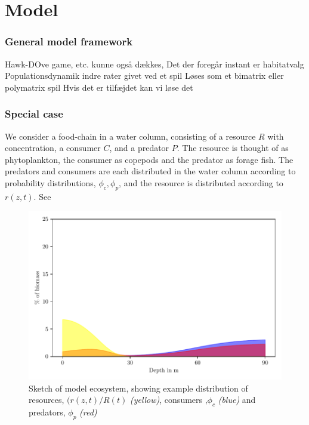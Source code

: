 
\section{Model}
\subsubsection*{General model framework}
Hawk-DOve game, etc. kunne også dækkes,
Det der foregår instant er habitatvalg
Populationsdynamik indre rater givet ved et spil
Løses som et bimatrix eller polymatrix spil
Hvis det er tilfæjdet kan vi løse det


\subsubsection*{Special case}
We consider a food-chain in a water column, consisting of a resource $R$ with concentration, a consumer $C$, and a predator $P$. The resource is thought of as phytoplankton, the consumer as copepods and the predator as forage fish. The predators and consumers are each distributed in the water column according to probability distributions, $\phi_c,\phi_p$, and the resource is distributed according to $r(z,t)$. See 
\begin{figure}
 \begin{centering}
   \includegraphics{plots/sketch_for_article.pdf}
 \end{centering}
 \label{fig:model_sketch}
 \caption{Sketch of model ecosystem, showing example distribution of resources, $(r(z,t)/R(t)$ \emph{(yellow)}, consumers ,$\phi_c$ \emph{(blue)} and predators, $\phi_p$ \emph{(red)}}
\end{figure}

